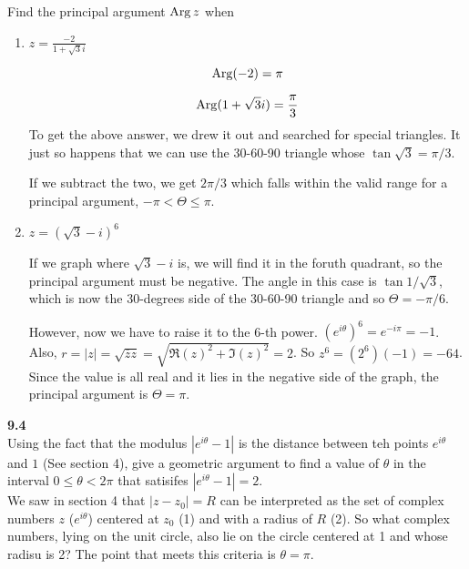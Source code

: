 Find the principal argument $\operatorname{Arg} z$ when
\begin{enumerate}
\item $z = \frac{-2}{1 + \sqrt{3}i}$

$$
\operatorname{Arg} (-2) = \pi
$$

$$
\operatorname{Arg} (1 + \sqrt{3}i) = \frac{\pi}{3}
$$
To get the above answer, we drew it out and searched for special triangles.
It just so happens that we can use the 30-60-90 triangle whose $\tan \sqrt{3} = \pi/3$.

If we subtract the two, we get $2\pi/3$ which falls within the valid range for a principal argument, $-\pi < \Theta \leq \pi$.

\item $z = \left(\sqrt{3}-i\right)^6$

If we graph where $\sqrt{3}-i$ is, we will find it in the foruth quadrant, so the principal argument must be negative.
The angle in this case is $\tan 1/\sqrt{3}$, which is now the 30-degrees side of the 30-60-90 triangle and so $\Theta = -\pi/6$.

However, now we have to raise it to the 6-th power.
$\left(e^{i\theta}\right)^6 = e^{-i\pi} = -1$.
Also, $r = |z| = \sqrt{\overline{z}z} = \sqrt{\Re{(z)}^2 + \Im{(z)}^2 } = 2$.
So $z^6 = (2^6)(-1) = -64$.
Since the value is all real and it lies in the negative side of the graph, the principal argument is $\Theta = \pi$.

\end{enumerate}


\textbf{9.4}
\\

Using the fact that the modulus $|e^{i\theta} - 1|$ is the distance between teh points $e^{i\theta}$ and $1$
(See section 4), give a geometric argument to find a value of $\theta$ in the interval $0 \leq \theta < 2\pi$
that satisifes $|e^{i\theta} - 1| = 2$.
\\

We saw in section 4 that $|z - z_0| = R$ can be interpreted as the set of complex numbers $z$ ($e^{i\theta}$)
centered at $z_0$ (1) and with a radius of $R$ (2).
So what complex numbers, lying on the unit circle, also lie on the circle centered at 1 and whose radisu is 2?
The point that meets this criteria is $\theta = \pi$.
\\~\\


